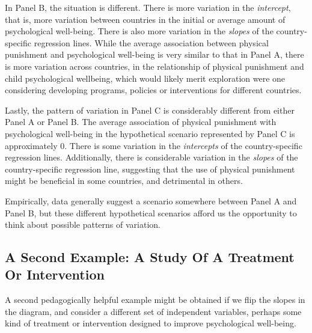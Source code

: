 \documentclass[
  letterpaper,
  DIV=11,
  numbers=noendperiod]{scrreprt}
\begin{document}
In Panel B, the situation is different. There is more variation in the
\emph{intercept}, that is, more variation between countries in the
initial or average amount of psychological well-being. There is also
more variation in the \emph{slopes} of the country-specific regression
lines. While the average association between physical punishment and
psychological well-being is very similar to that in Panel A, there is
more variation across countries, in the relationship of physical
punishment and child psychological wellbeing, which would likely merit
exploration were one considering developing programs, policies or
interventions for different countries.

Lastly, the pattern of variation in Panel C is considerably different
from either Panel A or Panel B. The average association of physical
punishment with psychological well-being in the hypothetical scenario
represented by Panel C is approximately 0. There is some variation in
the \emph{intercepts} of the country-specific regression lines.
Additionally, there is considerable variation in the \emph{slopes} of
the country-specific regression line, suggesting that the use of
physical punishment might be beneficial in some countries, and
detrimental in others.

Empirically, data generally suggest a scenario somewhere between Panel A
and Panel B, but these different hypothetical scenarios afford us the
opportunity to think about possible patterns of variation.

\subsection{A Second Example: A Study Of A Treatment Or
Intervention}\label{a-second-example-a-study-of-a-treatment-or-intervention}

A second pedagogically helpful example might be obtained if we flip the
slopes in the diagram, and consider a different set of independent
variables, perhaps some kind of treatment or intervention designed to
improve psychological well-being.
\end{document}
